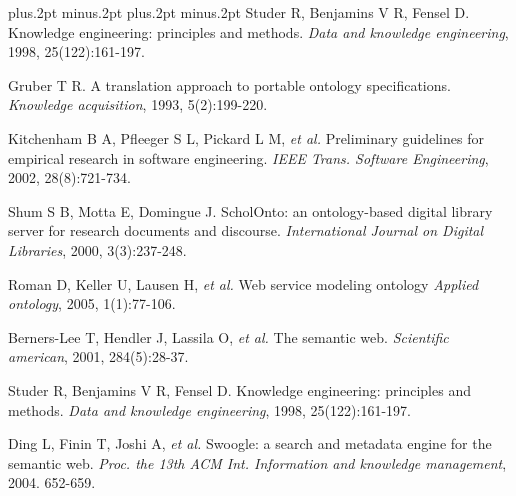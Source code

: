 \documentclass[twoside]{article}
\begin{document}
\begin{thebibliography}{99}
\footnotesize
\itemsep=-3pt plus.2pt minus.2pt
\baselineskip=13pt plus.2pt minus.2pt
Studer R, Benjamins V R, Fensel D. Knowledge engineering: principles and methods. {\it Data and knowledge engineering}, 1998, 25(122):161-197.

Gruber T R. A translation approach to portable ontology specifications. {\it Knowledge acquisition}, 1993, 5(2):199-220.

Kitchenham B A, Pfleeger S L, Pickard L M, {\it et al.} Preliminary guidelines for empirical research in software engineering. {\it IEEE Trans. Software Engineering}, 2002, 28(8):721-734.

Shum S B, Motta E, Domingue J. ScholOnto: an ontology-based digital library server for research documents and discourse. {\it International Journal on Digital Libraries}, 2000, 3(3):237-248.

Roman D, Keller U, Lausen H, {\it et al.} Web service modeling ontology {\it Applied ontology}, 2005, 1(1):77-106.

Berners-Lee T, Hendler J, Lassila O, {\it et al.} The semantic web. {\it Scientific american}, 2001, 284(5):28-37.

Studer R, Benjamins V R, Fensel D. Knowledge engineering: principles and methods. {\it Data and knowledge engineering}, 1998, 25(122):161-197.

Ding L, Finin T, Joshi A, {\it et al.} Swoogle: a search and metadata engine for the semantic web. {\it Proc. the 13th ACM Int. Information and knowledge management}, 2004. 652-659.


\end{thebibliography}
\end{document}
